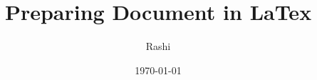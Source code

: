 \documentclass{article}
\begin{document}
	\title{Preparing Document in LaTex}
	\author{Rashi}
	\date{\today}
	\maketitle
	\textbf{\textit{\blindtext}}\\
	
	\blindtext
\end{document}
